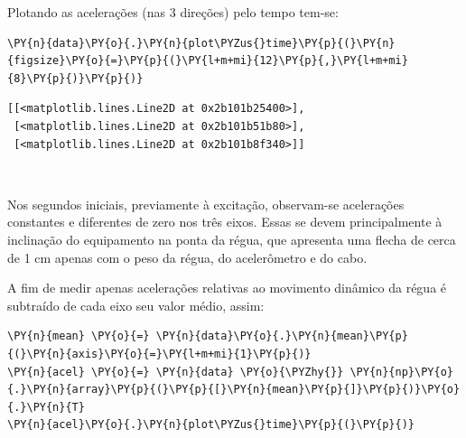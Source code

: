     Plotando as acelerações (nas 3 direções) pelo tempo tem-se:

    \begin{tcolorbox}[breakable, size=fbox, boxrule=1pt, pad at break*=1mm,colback=cellbackground, colframe=cellborder]
\begin{Verbatim}[commandchars=\\\{\}]
\PY{n}{data}\PY{o}{.}\PY{n}{plot\PYZus{}time}\PY{p}{(}\PY{n}{figsize}\PY{o}{=}\PY{p}{(}\PY{l+m+mi}{12}\PY{p}{,}\PY{l+m+mi}{8}\PY{p}{)}\PY{p}{)}
\end{Verbatim}
\end{tcolorbox}

            \begin{tcolorbox}[breakable, size=fbox, boxrule=.5pt, pad at break*=1mm, opacityfill=0]
\begin{Verbatim}[commandchars=\\\{\}]
[[<matplotlib.lines.Line2D at 0x2b101b25400>],
 [<matplotlib.lines.Line2D at 0x2b101b51b80>],
 [<matplotlib.lines.Line2D at 0x2b101b8f340>]]
\end{Verbatim}
\end{tcolorbox}
        
    \begin{center}
    \end{center}
    { \hspace*{\fill} \\}
    
    Nos segundos iniciais, previamente à excitação, observam-se acelerações
constantes e diferentes de zero nos três eixos. Essas se devem
principalmente à inclinação do equipamento na ponta da régua, que
apresenta uma flecha de cerca de 1 cm apenas com o peso da régua, do
acelerômetro e do cabo.

A fim de medir apenas acelerações relativas ao movimento dinâmico da
régua é subtraído de cada eixo seu valor médio, assim:

    \begin{tcolorbox}[breakable, size=fbox, boxrule=1pt, pad at break*=1mm,colback=cellbackground, colframe=cellborder]
\begin{Verbatim}[commandchars=\\\{\}]
\PY{n}{mean} \PY{o}{=} \PY{n}{data}\PY{o}{.}\PY{n}{mean}\PY{p}{(}\PY{n}{axis}\PY{o}{=}\PY{l+m+mi}{1}\PY{p}{)}
\PY{n}{acel} \PY{o}{=} \PY{n}{data} \PY{o}{\PYZhy{}} \PY{n}{np}\PY{o}{.}\PY{n}{array}\PY{p}{(}\PY{p}{[}\PY{n}{mean}\PY{p}{]}\PY{p}{)}\PY{o}{.}\PY{n}{T}
\PY{n}{acel}\PY{o}{.}\PY{n}{plot\PYZus{}time}\PY{p}{(}\PY{p}{)}
\end{Verbatim}
\end{tcolorbox}

